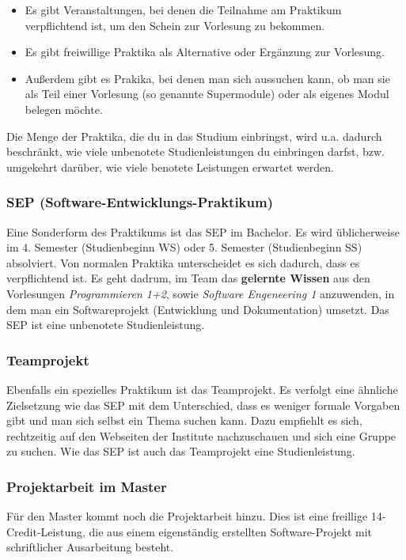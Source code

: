 \begin{multicols}{2}
	\begin{itemize}
		\item Es gibt Veranstaltungen, bei denen die Teilnahme am Praktikum verpflichtend ist, um den Schein zur Vorlesung zu bekommen. 
		\item Es gibt freiwillige Praktika als Alternative oder Ergänzung zur Vorlesung.
		\item Außerdem gibt es Prakika, bei denen man sich aussuchen kann, ob man sie als Teil einer Vorlesung (so genannte Supermodule) oder als eigenes Modul belegen möchte.
	\end{itemize}

	Die Menge der Praktika, die du in das Studium einbringst, wird u.a. dadurch beschränkt, wie viele unbenotete Studienleistungen du einbringen darfst, bzw. umgekehrt darüber, wie viele benotete Leistungen erwartet werden.

	\subsubsection*{SEP (Software-Entwicklungs-Praktikum)}
	Eine Sonderform des Praktikums ist das SEP im Bachelor. Es wird üblicherweise im 4. Semester (Studienbeginn WS) oder 5. Semester (Studienbeginn SS) absolviert. Von normalen Praktika unterscheidet es sich dadurch, dass es verpflichtend ist. Es geht dadrum, im Team das \textbf{gelernte Wissen} aus den Vorlesungen \emph{Programmieren 1+2}, sowie \emph{Software Engeneering 1} anzuwenden, in dem man ein Softwareprojekt (Entwicklung und Dokumentation) umsetzt. Das SEP ist eine unbenotete Studienleistung.

	\subsubsection*{Teamprojekt}
	Ebenfalls ein spezielles Praktikum ist das Teamprojekt. Es verfolgt eine ähnliche Zielsetzung wie das SEP mit dem Unterschied, dass es weniger formale Vorgaben gibt und man sich selbst ein Thema suchen kann. Dazu empfiehlt es sich, rechtzeitig auf den Webseiten der Institute nachzuschauen und sich eine Gruppe zu suchen. Wie das SEP ist auch das Teamprojekt eine Studienleistung.

	\subsubsection*{Projektarbeit im Master}
	Für den Master kommt noch die Projektarbeit hinzu. Dies ist eine freillige 14-Credit-Leistung, die aus einem eigenständig erstellten Software-Projekt mit schriftlicher Ausarbeitung besteht.


\end{multicols}
